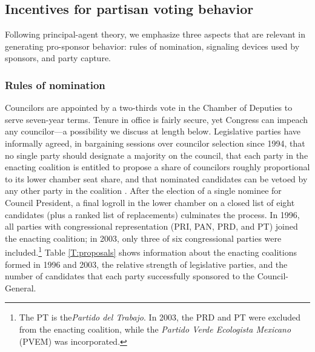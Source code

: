 \documentclass[12 pt, letter]{article}
\begin{document}
\subsection{Incentives for partisan voting behavior}
Following principal-agent theory, we emphasize three aspects that are relevant in generating pro-sponsor behavior: rules of nomination, signaling devices used by sponsors, and party capture.

\subsubsection{Rules of nomination}
Councilors are appointed by a two-thirds vote in the Chamber of Deputies to serve seven-year terms.  Tenure in office is fairly secure, yet Congress can impeach any councilor---a possibility we discuss at length below.  Legislative parties have informally agreed, in bargaining sessions over councilor selection since 1994, that no single party should designate a majority on the council, that each party in the enacting coalition is entitled to propose a share of councilors roughly proportional to its lower chamber seat share, and that nominated candidates can be vetoed by any other party in the coalition \citep{Alcocer1995, Schedler2000a}. After the election of a single nominee for Council President, a final logroll in the lower chamber on a closed list of eight candidates (plus a ranked list of replacements) culminates the process.  In 1996, all parties with congressional representation (PRI, PAN, PRD, and PT) joined the enacting coalition; in 2003, only three of six congressional parties were included.\footnote{The PT is the\emph{Partido del Trabajo}.  In 2003, the PRD and PT were excluded from the enacting coalition, while the \emph{Partido Verde Ecologista Mexicano} (PVEM) was incorporated.}  Table \ref{T:proposals} shows information about the enacting coalitions formed in 1996 and 2003, the relative strength of legislative parties, and the number of candidates that each party successfully sponsored to the Council-General.
\end{document}
